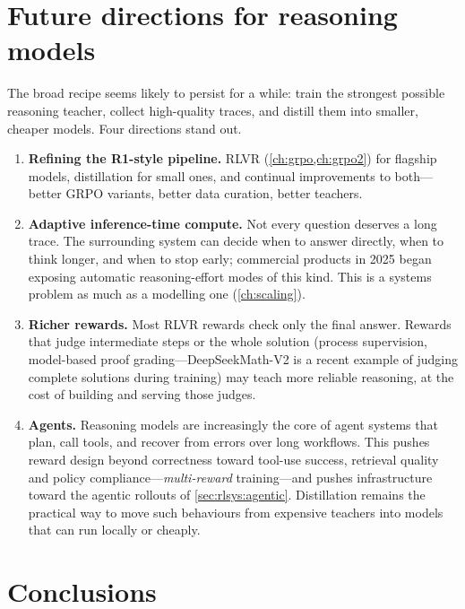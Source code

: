 \section{Future directions for reasoning models}\label{sec:distill:future}

The broad recipe seems likely to persist for a while: train the strongest possible reasoning
teacher, collect high-quality traces, and distill them into smaller, cheaper models. Four
directions stand out.
\begin{enumerate}
\item \textbf{Refining the R1-style pipeline.} RLVR (\cref{ch:grpo,ch:grpo2}) for flagship
models, distillation for small ones, and continual improvements to both---better GRPO variants,
better data curation, better teachers.
\item \textbf{Adaptive inference-time compute.} Not every question deserves a long trace. The
surrounding system can decide when to answer directly, when to think longer, and when to stop
early; commercial products in 2025 began exposing automatic reasoning-effort modes of this kind.
This is a systems problem as much as a modelling one (\cref{ch:scaling}).
\item \textbf{Richer rewards.} Most RLVR rewards check only the final answer. Rewards that
judge intermediate steps or the whole solution (process supervision, model-based proof
grading---DeepSeekMath-V2 is a recent example of judging complete solutions during training) may
teach more reliable reasoning, at the cost of building and serving those judges.
\item \textbf{Agents.} Reasoning models are increasingly the core of agent systems that plan,
call tools, and recover from errors over long workflows. This pushes reward design beyond
correctness toward tool-use success, retrieval quality and policy compliance---\emph{multi-reward}
training---and pushes infrastructure toward the agentic rollouts of \cref{sec:rlsys:agentic}.
Distillation remains the practical way to move such behaviours from expensive teachers into
models that can run locally or cheaply.
\end{enumerate}

\section{Conclusions}\label{sec:distill:conclusions}

